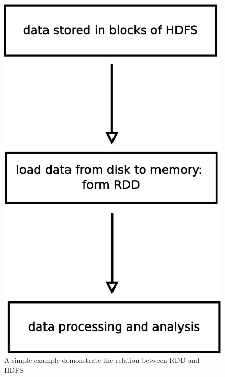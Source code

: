 \documentclass[notheorems, aspectratio=54]{beamer}
\begin{document}

\begin{frame}

\begin{figure}
 \includegraphics[scale=0.3]{rdd1}
\caption{A simple example demonstrate the relation between RDD and HDFS}
\end{figure} 

\end{frame}


\end{document}
